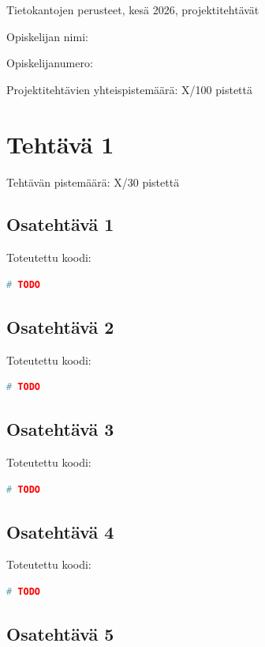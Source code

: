 \documentclass[a4paper,11pt]{article}
\begin{document}
{\LARGE Tietokantojen perusteet, kesä 2026, projektitehtävät}

Opiskelijan nimi:

Opiskelijanumero:

Projektitehtävien yhteispistemäärä: X/100 pistettä

\section*{Tehtävä 1}

Tehtävän pistemäärä: X/30 pistettä

\subsection*{Osatehtävä 1}

Toteutettu koodi:

\begin{lstlisting}[language=Python]
# TODO
\end{lstlisting}

\subsection*{Osatehtävä 2}

Toteutettu koodi:

\begin{lstlisting}[language=Python]
# TODO
\end{lstlisting}

\subsection*{Osatehtävä 3}

Toteutettu koodi:

\begin{lstlisting}[language=Python]
# TODO
\end{lstlisting}

\subsection*{Osatehtävä 4}

Toteutettu koodi:

\begin{lstlisting}[language=Python]
# TODO
\end{lstlisting}

\subsection*{Osatehtävä 5}
\end{document}

